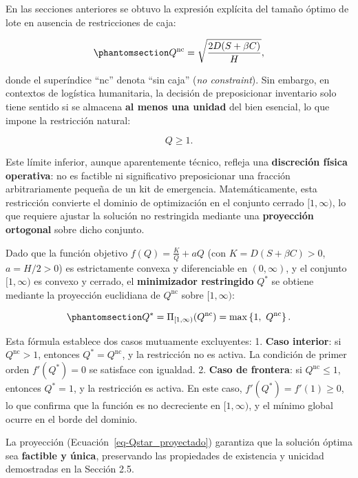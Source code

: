 \documentclass[
  spanish,
  us-letterpaper,
  DIV=11,
  numbers=noendperiod]{scrreprt}
\numberwithin{equation}{section}
\begin{document}
En las secciones anteriores se obtuvo la expresión explícita del tamaño
óptimo de lote en ausencia de restricciones de caja:

\begin{equation}\phantomsection\label{eq-Qstar_sin_caja_26_4}{
Q^{\text{nc}} = \sqrt{\frac{2 D (S + \beta C)}{H}},
}\end{equation}

donde el superíndice ``nc'' denota ``sin caja'' (\emph{no constraint}).
Sin embargo, en contextos de logística humanitaria, la decisión de
preposicionar inventario solo tiene sentido si se almacena \textbf{al
menos una unidad} del bien esencial, lo que impone la restricción
natural:

\[
Q \geq 1.
\]

Este límite inferior, aunque aparentemente técnico, refleja una
\textbf{discreción física operativa}: no es factible ni significativo
preposicionar una fracción arbitrariamente pequeña de un kit de
emergencia. Matemáticamente, esta restricción convierte el dominio de
optimización en el conjunto cerrado \([1, \infty)\), lo que requiere
ajustar la solución no restringida mediante una \textbf{proyección
ortogonal} sobre dicho conjunto.

Dado que la función objetivo \(f(Q) = \frac{K}{Q} + a Q\) (con
\(K = D(S + \beta C) > 0\), \(a = H/2 > 0\)) es estrictamente convexa y
diferenciable en \((0, \infty)\), y el conjunto \([1, \infty)\) es
convexo y cerrado, el \textbf{minimizador restringido} \(Q^*\) se
obtiene mediante la proyección euclidiana de \(Q^{\text{nc}}\) sobre
\([1, \infty)\):

\begin{equation}\phantomsection\label{eq-Qstar_proyectado}{
Q^* = \Pi_{[1, \infty)}(Q^{\text{nc}}) = \max\left\{ 1,\ Q^{\text{nc}} \right\}.
}\end{equation}

Esta fórmula establece dos casos mutuamente excluyentes: 1. \textbf{Caso
interior}: si \(Q^{\text{nc}} > 1\), entonces \(Q^* = Q^{\text{nc}}\), y
la restricción no es activa. La condición de primer orden
\(f'(Q^*) = 0\) se satisface con igualdad. 2. \textbf{Caso de frontera}:
si \(Q^{\text{nc}} \leq 1\), entonces \(Q^* = 1\), y la restricción es
activa. En este caso, \(f'(Q^*) = f'(1) \geq 0\), lo que confirma que la
función es no decreciente en \([1, \infty)\), y el mínimo global ocurre
en el borde del dominio.

La proyección (Ecuación~\ref{eq-Qstar_proyectado}) garantiza que la
solución óptima sea \textbf{factible y única}, preservando las
propiedades de existencia y unicidad demostradas en la Sección 2.5.
\end{document}
